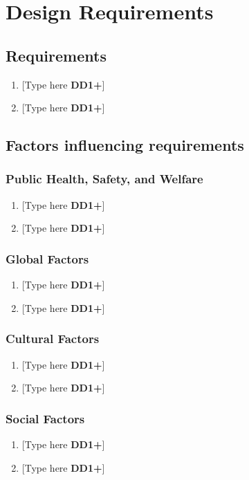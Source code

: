 \clearpage
\section{Design Requirements}
\subsection{Requirements}
\begin{enumerate}
    \item {[Type here \textbf{DD1+}]}
    \item {[Type here \textbf{DD1+}]}
\end{enumerate}

\clearpage

\subsection{Factors influencing requirements}
\subsubsection{Public Health, Safety, and Welfare}
\begin{enumerate}
    \item {[Type here \textbf{DD1+}]}
    \item {[Type here \textbf{DD1+}]}
\end{enumerate}

\subsubsection{Global Factors}
\begin{enumerate}
    \item {[Type here \textbf{DD1+}]}
    \item {[Type here \textbf{DD1+}]}
\end{enumerate}

\subsubsection{Cultural Factors}
\begin{enumerate}
    \item {[Type here \textbf{DD1+}]}
    \item {[Type here \textbf{DD1+}]}
\end{enumerate}

\subsubsection{Social Factors}
\begin{enumerate}
    \item {[Type here \textbf{DD1+}]}
    \item {[Type here \textbf{DD1+}]}
\end{enumerate}

